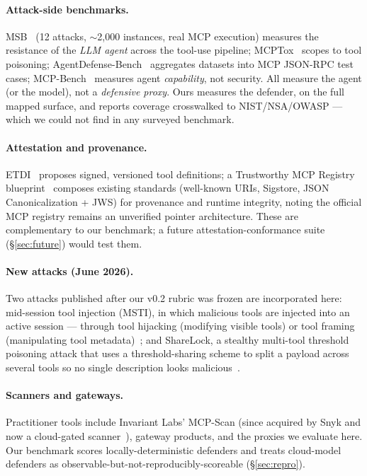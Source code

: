 \documentclass[11pt]{article}
\begin{document}
\paragraph{Attack-side benchmarks.} MSB~\citep{msb2510} (12 attacks, $\sim$2{,}000 instances, real MCP execution) measures the resistance of the \emph{LLM agent} across the tool-use pipeline; MCPTox~\citep{mcptox2508} scopes to tool poisoning; AgentDefense-Bench~\citep{agentdefense} aggregates datasets into MCP JSON-RPC test cases; MCP-Bench~\citep{mcpbench2508} measures agent \emph{capability}, not security. All measure the agent (or the model), not a \emph{defensive proxy}. Ours measures the defender, on the full mapped surface, and reports coverage crosswalked to NIST/NSA/OWASP --- which we could not find in any surveyed benchmark.

\paragraph{Attestation and provenance.} ETDI~\citep{etdi2506} proposes signed, versioned tool definitions; a Trustworthy MCP Registry blueprint~\citep{trustreg2026} composes existing standards (well-known URIs, Sigstore, JSON Canonicalization + JWS) for provenance and runtime integrity, noting the official MCP registry remains an unverified pointer architecture. These are complementary to our benchmark; a future attestation-conformance suite (\S\ref{sec:future}) would test them.

\paragraph{New attacks (June 2026).} Two attacks published after our v0.2 rubric was frozen are incorporated here: mid-session tool injection (MSTI), in which malicious tools are injected into an active session --- through tool hijacking (modifying visible tools) or tool framing (manipulating tool metadata)~\citep{webmcp2606}; and ShareLock, a stealthy multi-tool threshold poisoning attack that uses a threshold-sharing scheme to split a payload across several tools so no single description looks malicious~\citep{sharelock2606}.

\paragraph{Scanners and gateways.} Practitioner tools include Invariant Labs' MCP-Scan (since acquired by Snyk and now a cloud-gated scanner~\citep{snyk}), gateway products, and the proxies we evaluate here. Our benchmark scores locally-deterministic defenders and treats cloud-model defenders as observable-but-not-reproducibly-scoreable (\S\ref{sec:repro}).
\end{document}
